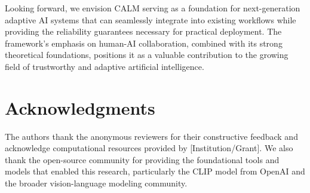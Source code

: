 \documentclass[conference]{IEEEtran}
\begin{document}
Looking forward, we envision CALM serving as a foundation for next-generation adaptive AI systems that can seamlessly integrate into existing workflows while providing the reliability guarantees necessary for practical deployment. The framework's emphasis on human-AI collaboration, combined with its strong theoretical foundations, positions it as a valuable contribution to the growing field of trustworthy and adaptive artificial intelligence.

\section*{Acknowledgments}

The authors thank the anonymous reviewers for their constructive feedback and acknowledge computational resources provided by [Institution/Grant]. We also thank the open-source community for providing the foundational tools and models that enabled this research, particularly the CLIP model from OpenAI and the broader vision-language modeling community.
\end{document}
